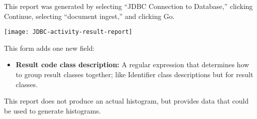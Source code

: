 \begin{changemargin}{1.5in}{0in}
This report was generated by selecting ``JDBC Connection to Database,''
clicking Continue, selecting ``document ingest,'' and clicking Go.

\texttt{[image: JDBC-activity-result-report]}

This form adds one new field:

\begin{itemize}

\item \textbf{Result code class description:} A regular expression that
determines how to group result classes together; like Identifier class
descriptions but for result classes.

\end{itemize}

This report does not produce an actual histogram, but provides data that
could be used to generate histograms.  


\end{changemargin}
